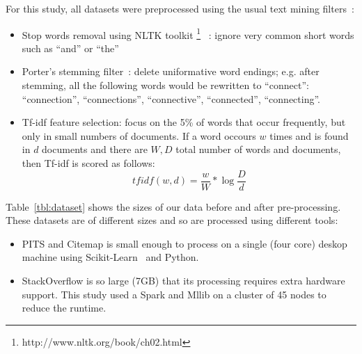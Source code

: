 \documentclass[10pt,conference]{IEEEtran}
\newcommand{\bi}{\begin{itemize}}
\newcommand{\ei}{\end{itemize}}
\theoremstyle{break}
\begin{document}
  For this study, all  datasets were preprocessed using the usual text mining filters~\cite{Feldman2007}:
\bi
\item
  Stop words removal using NLTK toolkit \footnote{http://www.nltk.org/book/ch02.html}~\cite{bird2006nltk} : ignore very common short words such as  ``and'' or ``the'' 
\item
  Porter's stemming filter~\cite{Porter1980}: delete uniformative word endings; e.g. after stemming, all the following words would be rewritten
  to ``connect'': ``connection'', ``connections'',
``connective'',          
``connected'',
  ``connecting''.
\item
  Tf-idf feature selection: focus on the 5\% of words that occur frequently,
  but only in small numbers of documents. If a word occours $w$ times
  and is found in $d$ documents  and there
  are $W,D$ total number of words and documents, then Tf-idf is scored
  as follows:
  \[
  \mathit{tfidf}(w,d)=   \frac{w}{W} *\log{\frac{D}{d}}\]
  \ei

  Table~\ref{tbl:dataset} shows the sizes of our data before and after pre-processing.
  These datasets are of different sizes and so are processed using different tools:
  \bi
\item PITS and Citemap is small enough to process on a single (four core) deskop machine
  using Scikit-Learn~\cite{pedregosa2011scikit} and Python.
  \item StackOverflow is so large (7GB) that its  processing requires extra hardware support.
 This study used a Spark and Mllib on a cluster of 45 nodes to
 reduce the runtime.
 \ei
  
\end{document}

